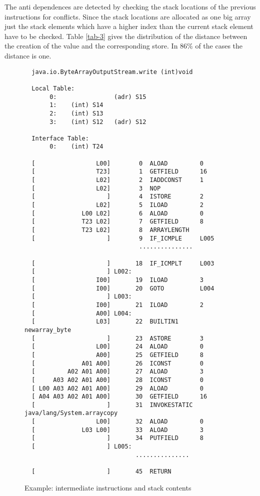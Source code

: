 The anti dependences are detected by checking the stack locations of the
previous instructions for conflicts. Since the stack locations are
allocated as one big array just the stack elements which have a higher
index than the current stack element have to be checked. Table \ref{tab-3}
gives the distribution of the distance between the creation of the value
and the corresponding store. In 86\% of the cases the distance is one.

\begin{figure*}[htb]
\begin{center}
\begin{verbatim}
  java.io.ByteArrayOutputStream.write (int)void

  Local Table:
       0:                (adr) S15
       1:    (int) S14
       2:    (int) S13
       3:    (int) S12   (adr) S12

  Interface Table:
       0:    (int) T24

  [                 L00]        0  ALOAD         0
  [                 T23]        1  GETFIELD      16
  [                 L02]        2  IADDCONST     1
  [                 L02]        3  NOP         
  [                    ]        4  ISTORE        2
  [                 L02]        5  ILOAD         2
  [             L00 L02]        6  ALOAD         0
  [             T23 L02]        7  GETFIELD      8
  [             T23 L02]        8  ARRAYLENGTH  
  [                    ]        9  IF_ICMPLE     L005
                                ...............

  [                    ]       18  IF_ICMPLT     L003
  [                    ] L002:
  [                 I00]       19  ILOAD         3
  [                 I00]       20  GOTO          L004
  [                    ] L003:
  [                 I00]       21  ILOAD         2
  [                 A00] L004:
  [                 L03]       22  BUILTIN1      newarray_byte
  [                    ]       23  ASTORE        3
  [                 L00]       24  ALOAD         0
  [                 A00]       25  GETFIELD      8
  [             A01 A00]       26  ICONST        0
  [         A02 A01 A00]       27  ALOAD         3
  [     A03 A02 A01 A00]       28  ICONST        0
  [ L00 A03 A02 A01 A00]       29  ALOAD         0
  [ A04 A03 A02 A01 A00]       30  GETFIELD      16
  [                    ]       31  INVOKESTATIC  java/lang/System.arraycopy
  [                 L00]       32  ALOAD         0
  [             L03 L00]       33  ALOAD         3
  [                    ]       34  PUTFIELD      8
  [                    ] L005:
                               ...............

  [                    ]       45  RETURN       
\end{verbatim}
\caption{Example: intermediate instructions and stack contents}
\label{IntermediateStack}
\end{center}
\end{figure*}

